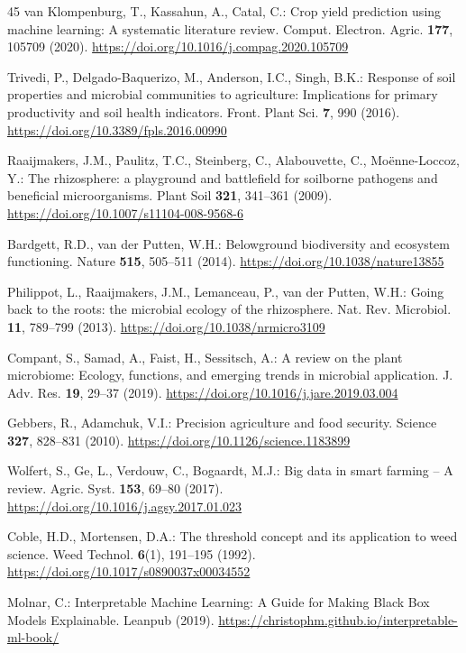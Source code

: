 \documentclass[runningheads,a4paper,oribibl]{llncs}
\begin{document}
\begin{thebibliography}{45}
van Klompenburg, T., Kassahun, A., Catal, C.: Crop yield prediction using machine learning: A systematic literature review. Comput. Electron. Agric. \textbf{177}, 105709 (2020). \url{https://doi.org/10.1016/j.compag.2020.105709}

Trivedi, P., Delgado-Baquerizo, M., Anderson, I.C., Singh, B.K.: Response of soil properties and microbial communities to agriculture: Implications for primary productivity and soil health indicators. Front. Plant Sci. \textbf{7}, 990 (2016). \url{https://doi.org/10.3389/fpls.2016.00990}

Raaijmakers, J.M., Paulitz, T.C., Steinberg, C., Alabouvette, C., Moënne-Loccoz, Y.: The rhizosphere: a playground and battlefield for soilborne pathogens and beneficial microorganisms. Plant Soil \textbf{321}, 341--361 (2009). \url{https://doi.org/10.1007/s11104-008-9568-6}

Bardgett, R.D., van der Putten, W.H.: Belowground biodiversity and ecosystem functioning. Nature \textbf{515}, 505--511 (2014). \url{https://doi.org/10.1038/nature13855}

Philippot, L., Raaijmakers, J.M., Lemanceau, P., van der Putten, W.H.: Going back to the roots: the microbial ecology of the rhizosphere. Nat. Rev. Microbiol. \textbf{11}, 789--799 (2013). \url{https://doi.org/10.1038/nrmicro3109}

Compant, S., Samad, A., Faist, H., Sessitsch, A.: A review on the plant microbiome: Ecology, functions, and emerging trends in microbial application. J. Adv. Res. \textbf{19}, 29--37 (2019). \url{https://doi.org/10.1016/j.jare.2019.03.004}

Gebbers, R., Adamchuk, V.I.: Precision agriculture and food security. Science \textbf{327}, 828--831 (2010). \url{https://doi.org/10.1126/science.1183899}

Wolfert, S., Ge, L., Verdouw, C., Bogaardt, M.J.: Big data in smart farming -- A review. Agric. Syst. \textbf{153}, 69--80 (2017). \url{https://doi.org/10.1016/j.agsy.2017.01.023}

Coble, H.D., Mortensen, D.A.: The threshold concept and its application to weed science. Weed Technol. \textbf{6}(1), 191--195 (1992). \url{https://doi.org/10.1017/s0890037x00034552}

Molnar, C.: Interpretable Machine Learning: A Guide for Making Black Box Models Explainable. Leanpub (2019). \url{https://christophm.github.io/interpretable-ml-book/}


\end{thebibliography}
\end{document}
